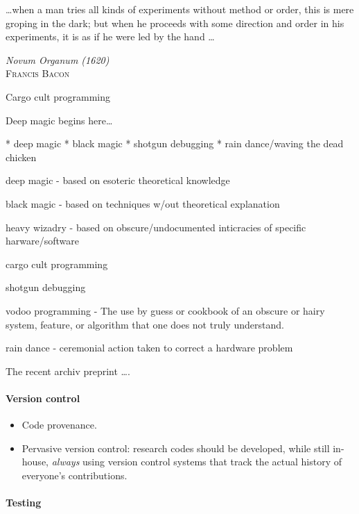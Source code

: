 \documentclass[ChapterTOCs,krantz2]{krantz} %
\begin{document}
\setlength{\epigraphrule}{0pt}
\setlength{\epigraphwidth}{.65\textwidth}
\epigraph%
{%
  \ldots when a man tries all kinds of experiments without method or
  order, this is mere groping in the dark; but when he proceeds with
  some direction and order in his experiments, it is as if he were
  led by the hand \ldots
}%
{\textit{Novum Organum (1620)}\\ \textsc{Francis Bacon} }

Cargo cult programming

Deep magic begins here\ldots

* deep magic
* black magic
* shotgun debugging
* rain dance/waving the dead chicken

  deep magic - based on esoteric theoretical knowledge
  
  black magic - based on techniques w/out theoretical explanation
  
  heavy wizadry - based on obscure/undocumented inticracies of specific 
                  harware/software
  
  cargo cult programming
  
  shotgun debugging
  
  vodoo programming -  The use by guess or cookbook of an
  obscure or hairy system, feature, or algorithm that one does not truly
  understand.

  rain dance - ceremonial action taken to correct a hardware problem



The recent archiv preprint \ldots \cite{2012arXiv1210.0530A}.
\paragraph{ {\bf Version control}}

\begin{itemize}

\item Code provenance.

\item Pervasive version control: research codes should be developed, while
still in-house, \emph{always} using version control systems that track
the actual history of everyone's contributions.

\end{itemize}

\paragraph{ {\bf Testing}}
\end{document}
